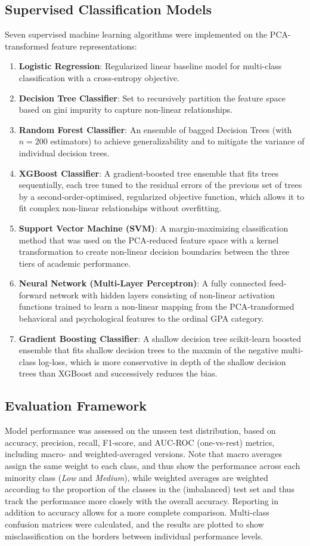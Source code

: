 \documentclass[conference]{IEEEtran}
\begin{document}
\subsection{Supervised Classification Models}
Seven supervised machine learning algorithms were implemented on the PCA-transformed feature representations:
\begin{enumerate}
    \item \textbf{Logistic Regression}: Regularized linear baseline model for multi-class classification with a cross-entropy objective.
    \item \textbf{Decision Tree Classifier}: Set to recursively partition the feature space based on gini impurity to capture non-linear relationships.
    \item \textbf{Random Forest Classifier}: An ensemble of bagged Decision Trees (with $n = 200$ estimators) to achieve generalizability and to mitigate the variance of individual decision trees.
    \item \textbf{XGBoost Classifier}:  A gradient-boosted tree ensemble that fits trees sequentially, each tree tuned to the residual errors of the previous set of trees by a second-order-optimised, regularized objective function, which allows it to fit complex non-linear relationships without overfitting.
    \item \textbf{Support Vector Machine (SVM)}: A margin-maximizing classification method that was used on the PCA-reduced feature space with a kernel transformation to create non-linear decision boundaries between the three tiers of academic performance.
    \item \textbf{Neural Network (Multi-Layer Perceptron)}: A fully connected feed-forward network with hidden layers consisting of non-linear activation functions trained to learn a non-linear mapping from the PCA-transformed behavioral and psychological features to the ordinal GPA category.
    \item \textbf{Gradient Boosting Classifier}: A shallow decision tree scikit-learn boosted ensemble that fits shallow decision trees to the maxmin of the negative multi-class log-loss, which is more conservative in depth of the shallow decision trees than XGBoost and successively reduces the bias.
\end{enumerate}


\subsection{Evaluation Framework}
Model performance was assessed on the unseen test distribution, based on accuracy, precision, recall, F1-score, and AUC-ROC (one-vs-rest) metrics, including macro- and weighted-averaged versions. Note that macro averages assign the same weight to each class, and thus show the performance across each minority class (\textit{Low} and \textit{Medium}), while weighted averages are weighted according to the proportion of the classes in the (imbalanced) test set and thus track the performance more closely with the overall accuracy. Reporting in addition to accuracy allows for a more complete comparison. Multi-class confusion matrices were calculated, and the results are plotted to show misclassification on the borders between individual performance levels.
\end{document}
